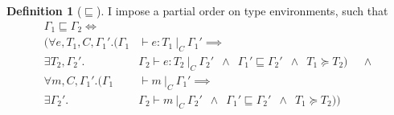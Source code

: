 \documentclass[a4paper]{article}
\theoremstyle{definition}
\newtheorem{definition}{Definition}[section]
\theoremstyle{dotless}
\begin{document}
\begin{definition}[$\sqsubseteq$]
  I impose a partial order on type environments, such that
  \begin{equation} \label{less-typed-eqn}
  	\begin{split}
	\Gamma_1 \sqsubseteq \Gamma_2 \iff &\\
		\big(\forall e, T_1, C, \Gamma_1' . ( \Gamma_1 &\vdash e : T_1\ |_C\ \Gamma_1' \implies\\
			\exists T_2, \Gamma_2' . &\Gamma_2 \vdash e : T_2\ |_C\ \Gamma_2' \enspace \land\enspace  \Gamma_1' \sqsubseteq \Gamma_2' \enspace \land\enspace  T_1 \succeq T_2 )\ \quad\land\\
		\forall m, C, \Gamma_1' . ( \Gamma_1 &\vdash m\ |_C\ \Gamma_1' \implies\\
			\exists \Gamma_2' . &\Gamma_2 \vdash m\ |_C\ \Gamma_2' \enspace\land\enspace \Gamma_1' \sqsubseteq \Gamma_2' \enspace\land\enspace T_1 \succeq T_2 ) \big)\\
  	\end{split}
  \end{equation}
\end{definition}
\end{document}
